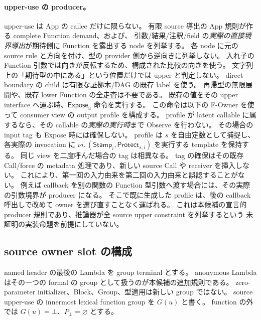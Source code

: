 \documentclass[11pt,a4paper]{article}
\begin{document}
\paragraph{upper-use の producer。}
upper-use は App の callee だけに限らない。
有限 source 導出の App 規則が作る complete Function demand、および、
引数/結果/注釈/field の\emph{実際の直接境界導出}が期待側に Function を露出する node を列挙する。
各 node に元の source rule と方向を付け、型の provider 側から逆向きに列挙しない。
入れ子の Function 引数では向きが反転するため、構成された比較の向きを使う。
文字列上の「期待型の中にある」という位置だけでは upper と判定しない。
direct boundary の child は有限な証拠木/DAG の既存 label を使う。
再帰型の無限展開や、既存 lower Function の全走査は不要である。
既存の値をその upper interface へ運ぶ時、\(\mathsf{Expose}_u\) 命令を実行する。
この命令は以下の F-Owner を使って consumer view の output profile を構成する。
profile が latent callable に属するなら、その callable の\emph{実際の実行時}まで Observe を行わない。
その場合の input tag も Expose 時には確保しない。
profile は \(s\) を自由定数として捕捉し、各実際の invocation に
\(\nu i.\,(\mathsf{Stamp}_i,\mathsf{Protect}_{s,i})\) を実行する template を保持する。
同じ view を二度呼んだ場合の tag は相異なる。
tag の確保はその既存 Call/force の metadata 処理であり、新しい source Call や receiver を挿入しない。
これにより、第一回の入力由来を第二回の入力由来と誤認することがない。
例えば callback を別の関数の Function 型引数へ渡す場合には、その実際の引数境界が producer になる。
そこで既に生成した profile は、後の callback 呼出しで改めて owner を選び直すことなく運ばれる。
これは本候補の宣言的 producer 規則であり、推論器が全 source upper constraint を列挙するという
未証明の実装命題を前提にしていない。

\subsection{source owner slot の構成}

named header の最後の Lambda を group terminal とする。
anonymous Lambda はその一つの formal の group として扱うのが本候補の追加規則である。
zero-parameter initializer、Block、Group、型適用は新しい group ではない。
source upper-use の innermost lexical function group を \(G(u)\) と書く。
function の外では \(G(u)=\bot\)、\(P_\bot=\varnothing\) とする。
\end{document}
